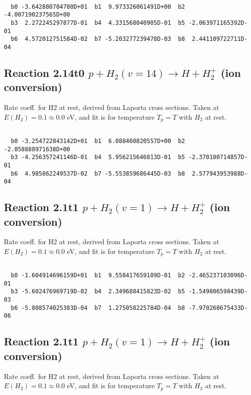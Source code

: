 \begin{small}\begin{verbatim}

  b0 -3.642880704780D+01  b1  9.973326061491D+00  b2 -4.007190237565D+00
  b3  2.272245297877D-01  b4  4.331568040905D-01  b5 -2.063971165392D-01
  b6  4.572012751584D-02  b7 -5.203277239478D-03  b8  2.441109722711D-04

\end{verbatim}\end{small}

\newpage
\subsection{
Reaction 2.14t0
$ p + H_2(v=14) \rightarrow H + H_2^+$ (ion conversion)
}
Rate coeff. for H2 at rest, derived from Laporta cross sections.
Taken at $E(H_2) = 0.1 \approx 0.0$ eV,  and fit is for temperature $T_p=T$ with $H_2$ at rest.

\begin{small}\begin{verbatim}

  b0 -3.254722843142D+01  b1  6.088460820557D+00  b2 -2.058888971638D+00
  b3 -4.256357241146D-01  b4  5.956215646813D-01  b5 -2.370180714857D-01
  b6  4.985862249537D-02  b7 -5.553859686445D-03  b8  2.577943953988D-04

\end{verbatim}\end{small}

\newpage
\subsection{
Reaction 2.1t1
$ p + H_2(v=1) \rightarrow H + H_2^+$ (ion conversion)
}
Rate coeff. for H2 at rest, derived from Laporta cross sections.
Taken at $E(H_2) = 0.1 \approx 0.0$ eV,  and fit is for temperature $T_p=T$ with $H_2$ at rest.

\begin{small}\begin{verbatim}

  b0 -1.604914696159D+01  b1  9.558417659189D-01  b2 -2.465237103096D-01
  b3 -5.602476969719D-02  b4  2.349688415823D-02  b5 -1.549806598439D-03
  b6 -5.808574025383D-04  b7  1.275058225784D-04  b8 -7.970268675433D-06

\end{verbatim}\end{small}

\newpage
\subsection{
Reaction 2.1t1
$ p + H_2(v=1) \rightarrow H + H_2^+$ (ion conversion)
}
Rate coeff. for H2 at rest, derived from Laporta cross sections.
Taken at $E(H_2) = 0.1 \approx 0.0$ eV,  and fit is for temperature $T_p=T$ with $H_2$ at rest.

